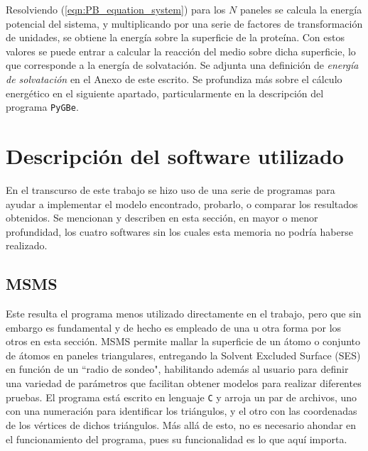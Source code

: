 \documentclass[12pt, oneside, numbers, spanish]{ezthesis}
\numberwithin{equation}{section}
\begin{document}
Resolviendo (\ref{eqn:PB_equation_system}) para los $N$ paneles se calcula la energía potencial del sistema, y multiplicando por una serie de factores de transformación de unidades, se obtiene la energía sobre la superficie de la proteína. Con estos valores se puede entrar a calcular la reacción del medio sobre dicha superficie, lo que corresponde a la energía de solvatación. Se adjunta una definición de \textit{energía de solvatación} en el Anexo de este escrito. Se profundiza más sobre el cálculo energético en el siguiente apartado, particularmente en la descripción del programa \texttt{PyGBe}.






\section{Descripción del software utilizado}\label{Sec:SW_Description}
En el transcurso de este trabajo se hizo uso de una serie de programas para ayudar a implementar el modelo encontrado, probarlo, o comparar los resultados obtenidos. Se mencionan y describen en esta sección, en mayor o menor profundidad, los cuatro softwares sin los cuales esta memoria no podría haberse realizado.

\subsection{MSMS}\label{subsec:MSMS}
Este resulta el programa menos utilizado directamente en el trabajo, pero que sin embargo es fundamental y de hecho es empleado de una u otra forma por los otros en esta sección. MSMS permite mallar la superficie de un átomo o conjunto de átomos en paneles triangulares, entregando la Solvent Excluded Surface (SES) en función de un ``radio de sondeo", habilitando además al usuario para definir una variedad de parámetros que facilitan obtener modelos para realizar diferentes pruebas. El programa está escrito en lenguaje \texttt{C} y arroja un par de archivos, uno con una numeración para identificar los triángulos, y el otro con las coordenadas de los vértices de dichos triángulos. Más allá de esto, no es necesario ahondar en el funcionamiento del programa, pues su funcionalidad es lo que aquí importa.
\end{document}
